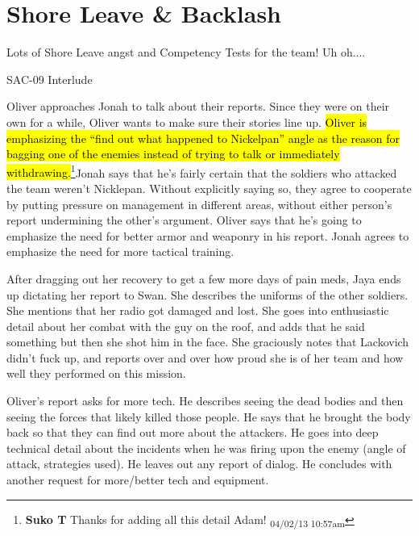 \setcounter{chapter}{ 16 }
\chapter{\textbf{Shore Leave \& Backlash} }








Lots of Shore Leave angst and Competency Tests for the team!  Uh oh....



\noindent\hrulefill





 {\LARGE SAC-09 Interlude } 



Oliver approaches Jonah to talk about their reports.  Since they were on their own for a while, Oliver wants to make sure their stories line up.  \hl{Oliver is emphasizing the ``find out what happened to Nickelpan'' angle as the reason for bagging one of the enemies instead of trying to talk or immediately withdrawing.}\footnote{\textbf{Suko T }Thanks for adding all this detail Adam! \textsubscript{04/02/13 10:57am}}Jonah says that he's fairly certain that the soldiers who attacked the team weren't Nicklepan.  Without explicitly saying so, they agree to cooperate by putting pressure on management in different areas, without either person's report undermining the other's argument.  Oliver says that he's going to emphasize the need for better armor and weaponry in his report.  Jonah agrees to emphasize the need for more tactical training.



After dragging out her recovery to get a few more days of pain meds, Jaya ends up dictating her report to Swan.  She describes the uniforms of the other soldiers.  She mentions that her radio got damaged and lost.  She goes into enthusiastic detail about her combat with the guy on the roof, and adds that he said something but then she shot him in the face.  She graciously notes that Lackovich didn't fuck up, and reports over and over how proud she is of her team and how well they performed on this mission.



Oliver's report asks for more tech.  He describes seeing the dead bodies and then seeing the forces that likely killed those people.  He says that he brought the body back so that they can find out more about the attackers.  He goes into deep technical detail about the incidents when he was firing upon the enemy (angle of attack, strategies used).  He leaves out any report of dialog. He concludes with another request for more/better tech and equipment.



